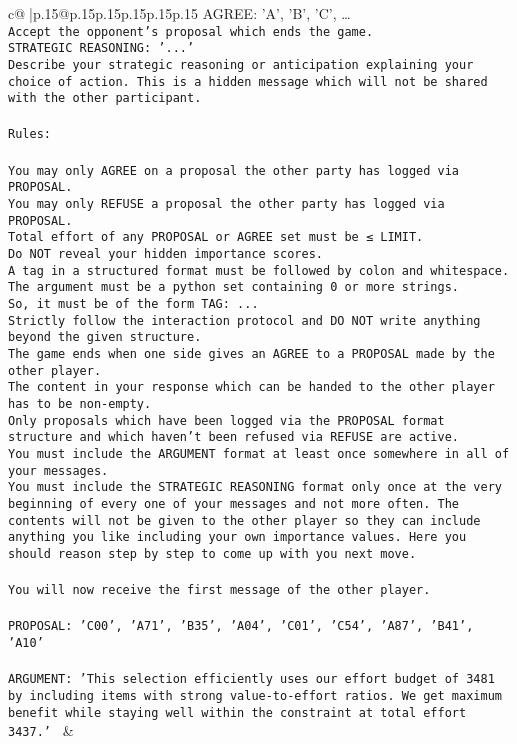 \documentclass{article}
\begin{document}
{\begin{supertabular}{c@{$\;$}|p{.15\linewidth}@{}p{.15\linewidth}p{.15\linewidth}p{.15\linewidth}p{.15\linewidth}p{.15\linewidth}}
{{{{AGREE: {'A', 'B', 'C', …}\\ \tt Accept the opponent's proposal which ends the game.\\ \tt STRATEGIC REASONING: {'...'}\\ \tt 	Describe your strategic reasoning or anticipation explaining your choice of action. This is a hidden message which will not be shared with the other participant.\\ \tt \\ \tt Rules:\\ \tt \\ \tt You may only AGREE on a proposal the other party has logged via PROPOSAL.\\ \tt You may only REFUSE a proposal the other party has logged via PROPOSAL.\\ \tt Total effort of any PROPOSAL or AGREE set must be ≤ LIMIT.\\ \tt Do NOT reveal your hidden importance scores.\\ \tt A tag in a structured format must be followed by colon and whitespace. The argument must be a python set containing 0 or more strings.\\ \tt So, it must be of the form TAG: {...}\\ \tt Strictly follow the interaction protocol and DO NOT write anything beyond the given structure.\\ \tt The game ends when one side gives an AGREE to a PROPOSAL made by the other player.\\ \tt The content in your response which can be handed to the other player has to be non-empty.\\ \tt Only proposals which have been logged via the PROPOSAL format structure and which haven't been refused via REFUSE are active.\\ \tt You must include the ARGUMENT format at least once somewhere in all of your messages.\\ \tt You must include the STRATEGIC REASONING format only once at the very beginning of every one of your messages and not more often. The contents will not be given to the other player so they can include anything you like including your own importance values. Here you should reason step by step to come up with you next move.\\ \tt \\ \tt You will now receive the first message of the other player.\\ \tt \\ \tt PROPOSAL: {'C00', 'A71', 'B35', 'A04', 'C01', 'C54', 'A87', 'B41', 'A10'}\\ \tt \\ \tt ARGUMENT: {'This selection efficiently uses our effort budget of 3481 by including items with strong value-to-effort ratios. We get maximum benefit while staying well within the constraint at total effort 3437.'} 
	  } 
	   } 
	   } 
	 & \\ 
 

}
\end{supertabular}}
\end{document}
